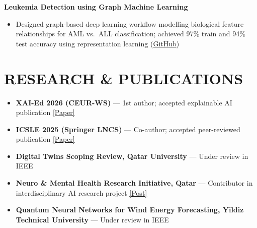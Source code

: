 \documentclass[letterpaper,9pt]{article}
\newcommand{\resumeItem}[1]{
  \item \small{#1}
}
\newcommand{\resumeProjectHeading}[1]{
  \vspace{1pt}
  \textbf{\small #1}
  \vspace{-1pt}
}
\begin{document}
\resumeProjectHeading{Leukemia Detection using Graph Machine Learning}
\begin{itemize}
\resumeItem{Designed graph-based deep learning workflow modelling biological feature relationships for AML vs.\ ALL classification; achieved 97\% train and 94\% test accuracy using representation learning (\href{https://github.com/92meharali}{GitHub})}
\end{itemize}

\section{RESEARCH \& PUBLICATIONS}
\begin{itemize}
\resumeItem{\textbf{XAI-Ed 2026 (CEUR-WS)} — 1st author; accepted explainable AI publication \href{https://www.xai-ed.net/papers/XAI-Ed_2026_paper_1.pdf}{[Paper]}}
\resumeItem{\textbf{ICSLE 2025 (Springer LNCS)} — Co-author; accepted peer-reviewed publication \href{https://www.researchgate.net/profile/Awais-Baig-3/publication/395837132_Barrier-Based_Inclusive_Design_in_VR_Addressing_DEI_Challenges_through_the_UDL_30_Framework/links/68d55eee220a341aa14f3264/Barrier-Based-Inclusive-Design-in-VR-Addressing-DEI-Challenges-through-the-UDL-30-Framework.pdf}{[Paper]}}
\resumeItem{\textbf{Digital Twins Scoping Review, Qatar University} — Under review in IEEE}
\resumeItem{\textbf{Neuro \& Mental Health Research Initiative, Qatar} — Contributor in interdisciplinary AI research project \href{https://www.linkedin.com/feed/update/urn:li:activity:7424050684309917696/}{[Post]}}
\resumeItem{\textbf{Quantum Neural Networks for Wind Energy Forecasting, Yildiz Technical University} — Under review in IEEE}
\end{itemize}

\end{document}
